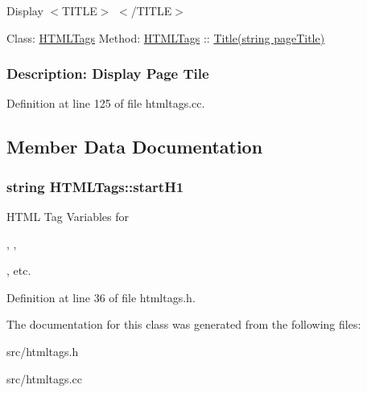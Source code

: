 Display $<$\-T\-I\-T\-L\-E$>$ $<$/\-T\-I\-T\-L\-E$>$ 



 Class\-: \hyperlink{classHTMLTags}{H\-T\-M\-L\-Tags} Method\-: \hyperlink{classHTMLTags}{H\-T\-M\-L\-Tags} \-:\-: \hyperlink{classHTMLTags_a5128d6f1c6be5ac1689047fc9d0d159f}{Title(string page\-Title)} \subsubsection*{Description\-: Display Page Tile}

Definition at line 125 of file htmltags.\-cc.



\subsection{Member Data Documentation}
\hypertarget{classHTMLTags_ae987289d0dab2e3e234048615f930d0f}{
\subsubsection[{start\-H1}]{\setlength{\rightskip}{0pt plus 5cm}string H\-T\-M\-L\-Tags\-::start\-H1\hspace{0.3cm}{\ttfamily [protected]}}}\label{classHTMLTags_ae987289d0dab2e3e234048615f930d0f}


H\-T\-M\-L Tag Variables for 

, , 

, etc. 



Definition at line 36 of file htmltags.\-h.



The documentation for this class was generated from the following files\-:\begin{DoxyCompactItemize}
\item 
src/htmltags.\-h\item 
src/htmltags.\-cc\end{DoxyCompactItemize}
